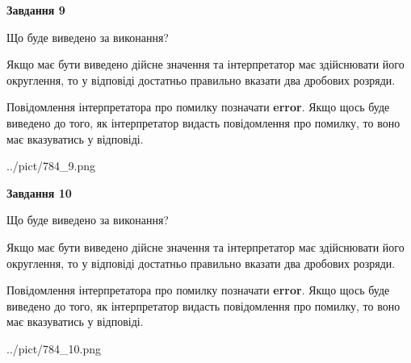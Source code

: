 \documentclass[12pt, ukrainian]{article}
\begin{document}
{\begin {Large}
{\begin {center}\textbf{Завдання 9}\end {center}}\par
Що буде виведено за виконання? \par

Якщо має бути виведено дійсне значення та інтерпретатор має здійснювати його округлення, 
то у відповіді достатньо правильно вказати два дробових розряди.

Повідомлення інтерпретатора про помилку позначати \textbf{error}.
Якщо щось буде виведено до того, як інтерпретатор видасть повідомлення про помилку, 
то воно має вказуватись у відповіді. \par

\begin{center}
	{../pict/784_9.png}
\end{center}
\newpage

{\begin {center}\textbf{Завдання 10}\end {center}}\par
Що буде виведено за виконання? \par

Якщо має бути виведено дійсне значення та інтерпретатор має здійснювати його округлення, 
то у відповіді достатньо правильно вказати два дробових розряди.

Повідомлення інтерпретатора про помилку позначати \textbf{error}.
Якщо щось буде виведено до того, як інтерпретатор видасть повідомлення про помилку, 
то воно має вказуватись у відповіді. \par

\begin{center}
	{../pict/784_10.png}
\end{center}
\newpage

\end {Large}}
\end{document}
